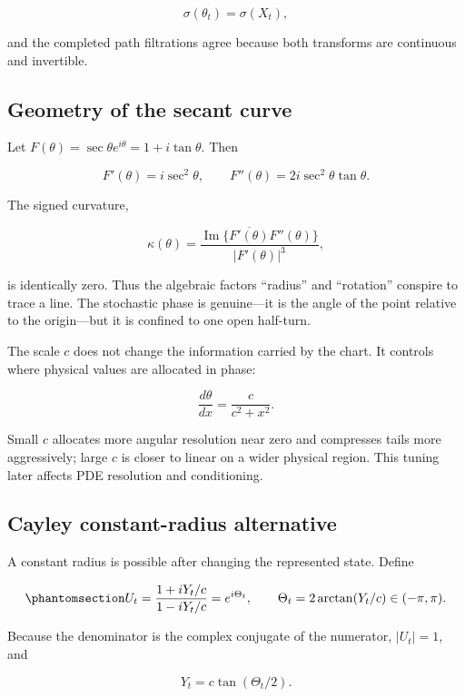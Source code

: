 \documentclass[
  english,
  10pt,
  letterpaper,
  DIV=11,
  numbers=noendperiod]{scrartcl}
\theoremstyle{definition}
\theoremstyle{plain}
\theoremstyle{plain}
\theoremstyle{remark}
\begin{document}
\[
\sigma(\theta_t)=\sigma(X_t),
\]

and the completed path filtrations agree because both transforms are
continuous and invertible.

\subsection{Geometry of the secant
curve}\label{geometry-of-the-secant-curve}

Let \(F(\theta)=\sec\theta e^{i\theta}=1+i\tan\theta\). Then

\[
F'(\theta)=i\sec^2\theta,\qquad
F''(\theta)=2i\sec^2\theta\tan\theta.
\]

The signed curvature,

\[
\kappa(\theta)
=
\frac{\operatorname{Im}\{\overline{F'(\theta)}F''(\theta)\}}
{|F'(\theta)|^3},
\]

is identically zero. Thus the algebraic factors ``radius'' and
``rotation'' conspire to trace a line. The stochastic phase is
genuine---it is the angle of the point relative to the origin---but it
is confined to one open half-turn.

The scale \(c\) does not change the information carried by the chart. It
controls where physical values are allocated in phase:

\[
\frac{d\theta}{dx}=\frac{c}{c^2+x^2}.
\]

Small \(c\) allocates more angular resolution near zero and compresses
tails more aggressively; large \(c\) is closer to linear on a wider
physical region. This tuning later affects PDE resolution and
conditioning.

\subsection{Cayley constant-radius
alternative}\label{cayley-constant-radius-alternative}

A constant radius is possible after changing the represented state.
Define

\begin{equation}\protect\phantomsection\label{eq-cayley-transform}{
U_t
=
\frac{1+iY_t/c}{1-iY_t/c}
=e^{i\Theta_t},
\qquad
\Theta_t=2\arctan(Y_t/c)\in(-\pi,\pi).
}\end{equation}

Because the denominator is the complex conjugate of the numerator,
\(|U_t|=1\), and

\[
Y_t=c\tan(\Theta_t/2).
\]
\end{document}
